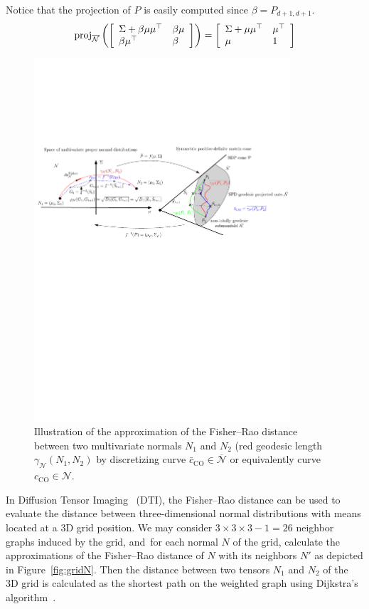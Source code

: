 \documentclass[entropy,article,accept,oneauthor,pdftex,entropy]{Definitions/mdpi}
\def\proj{\mathrm{proj}}
\def\barN{{\overline{\mathcal{N}}}}
\def\CO{\mathrm{CO}}
\def\mattwotwo#1#2#3#4{{\left[\begin{array}{ll}#1 & #2\cr #3 & #4\end{array}\right]}}
\def\calN{\mathcal{N}}
\begin{document}
Notice that the projection of $P$ is easily computed  since $\beta=P_{d+1,d+1}$.
$$
\proj_{\barN}\left(\mattwotwo{\Sigma+\beta\mu\mu^\top}{\beta\mu}{\beta\mu^\top}{\beta}\right)=\mattwotwo{\Sigma+\mu\mu^\top}{\mu^\top}{\mu}{1}
$$






\begin{figure}[H]

\includegraphics[width=0.85\textwidth]{FigIpe-ApproxFRMVN.pdf}
%
\caption{{Illustration} 
 of the approximation of the Fisher–Rao distance between two multivariate normals $N_1$ and $N_2$ (red geodesic length $\gamma_{\mathcal{N}}(N_1,N_2)$ by discretizing curve $\bar c_\CO\in\barN$ or equivalently curve $c_\CO\in\calN$.
 \label{fig:FRapprox}}
\end{figure}



\begin{Remark}
In Diffusion Tensor Imaging~\cite{MVNGeodesicShooting-2014} (DTI), 
the Fisher–Rao distance can be used to evaluate the distance between three-dimensional normal distributions with means located at a 3D grid position.
We may consider $3\times 3\times 3-1=26$ neighbor graphs induced by the grid, and~for each normal $N$ of the grid, calculate the approximations of the Fisher–Rao distance of $N$ with its neighbors $N'$ as depicted in Figure~\ref{fig:gridN}. 
Then the distance between two tensors $N_1$ and $N_2$ of the 3D grid is calculated as the shortest path on the weighted graph using Dijkstra's algorithm~\cite{MVNGeodesicShooting-2014}.
\end{Remark}
\end{document}
